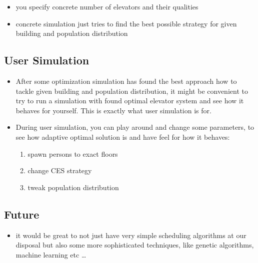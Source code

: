 \begin{itemize}
\item
  you specify concrete number of elevators and their qualities
\item
  concrete simulation just tries to find the best possible strategy for
  given building and population distribution
\end{itemize}

\hypertarget{user-simulation}{%
\subsection{User Simulation}\label{user-simulation}}

\begin{itemize}
\item
  After some optimization simulation has found the best approach how to
  tackle given building and population distribution, it might be
  convenient to try to run a simulation with found optimal elevator
  system and see how it behaves for yourself. This is exactly what user
  simulation is for.
\item
  During user simulation, you can play around and change some
  parameters, to see how adaptive optimal solution is and have feel for
  how it behaves:

  \begin{enumerate}
  \def\labelenumi{\arabic{enumi}.}
  \tightlist
  \item
    spawn persons to exact floors
  \item
    change CES strategy
  \item
    tweak population distribution
  \end{enumerate}
\end{itemize}

\hypertarget{future}{%
\subsection{Future}\label{future}}

\begin{itemize}
\tightlist
\item
  it would be great to not just have very simple scheduling algorithms
  at our disposal but also some more sophisticated techniques, like
  genetic algorithms, machine learning etc \ldots{}
\end{itemize}
